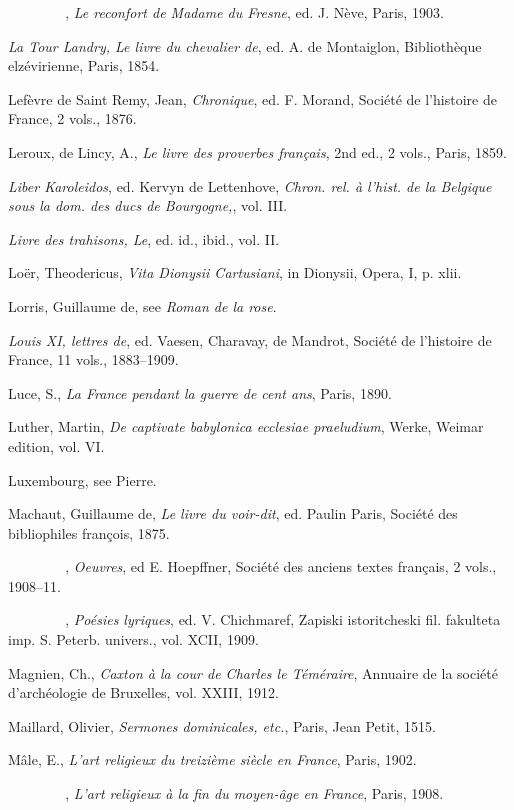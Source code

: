 \emph{{~~~~~~~~}}, \emph{Le reconfort de Madame du Fresne}, ed. J. Nève,
Paris, 1903.

\emph{La Tour Landry, Le livre du chevalier de}, ed. A. de Montaiglon,
Bibliothèque elzévirienne, Paris, 1854.

Lefèvre de Saint Remy, Jean, \emph{Chronique}, ed. F. Morand, Société de
l'histoire de France, 2 vols., 1876.

Leroux, de Lincy, A., \emph{Le livre des proverbes français}, 2nd ed., 2
vols., Paris, 1859.

\emph{Liber Karoleidos}, ed. Kervyn de Lettenhove, \emph{Chron. rel. à
l'hist. de la Belgique sous la dom. des ducs de Bourgogne,}, vol. III.

\emph{Livre des trahisons, Le}, ed. id., ibid., vol. II.

Loër, Theodericus, \emph{Vita Dionysii Cartusiani}, in Dionysii, Opera,
I, p. xlii.

Lorris, Guillaume de, see \emph{Roman de la rose}.

\emph{Louis XI, lettres de}, ed. Vaesen, Charavay, de Mandrot, Société
de l'histoire de France, 11 vols., 1883--1909.

Luce, S., \emph{La France pendant la guerre de cent ans}, Paris, 1890.

Luther, Martin, \emph{De captivate babylonica ecclesiae praeludium},
Werke, Weimar edition, vol. VI.

Luxembourg, see Pierre.

Machaut, Guillaume de, \emph{Le livre du voir-dit}, ed. Paulin Paris,
Société des bibliophiles françois, 1875.

\emph{{~~~~~~~~}}, \emph{Oeuvres}, ed E. Hoepffner, Société des anciens
textes français, 2 vols., 1908--11.

\emph{{~~~~~~~~}}, \emph{Poésies lyriques}, ed. V. Chichmaref, Zapiski
istoritcheski fil. fakulteta imp. S. Peterb. univers., vol. XCII, 1909.

Magnien, Ch., \emph{Caxton à la cour de Charles le Téméraire}, Annuaire
de la société d'archéologie de Bruxelles, vol. XXIII, 1912.

Maillard, Olivier, \emph{Sermones dominicales, etc.}, Paris, Jean Petit,
1515.

Mâle, E., \emph{L'art religieux du treizième siècle en France}, Paris,
1902.

\emph{\protect\hypertarget{24_BIBLIOGRAPHY.xhtmlux5cux23page_447}{}{}{~~~~~~~~}},
\emph{L'art religieux à la fin du moyen-âge en France}, Paris, 1908.

